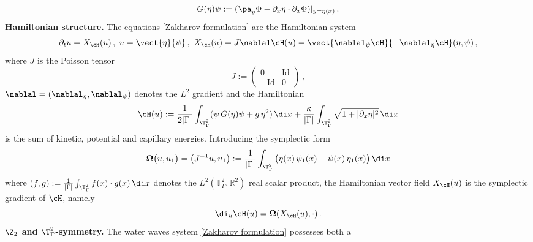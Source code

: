 \documentclass[11pt,a4paper,reqno]{article}
\numberwithin{equation}{section}
\theoremstyle{definition}
\begin{document}
    $$    G(\eta)\psi  :=
     ( \pa_y \Phi  - \partial_x \eta \cdot \partial_x\Phi)|_{y = \eta(x)} \, .
    $$ 
    {\bf Hamiltonian structure.}
    The equations \eqref{Zakharov formulation} are the Hamiltonian system 
    \begin{equation}\label{Zakharov formulation Hamiltonian}
            \partial_t  u = X_{\cH} (u) \, , \ u = \vect{\eta}{\psi}  \, , 
            \ X_{\cH} (u) = J \nablal \cH (u) = 
             \vect{\nablal_\psi \cH}{-\nablal_\eta \cH} 
             (\eta,\psi)   \, , 
    \end{equation}
    where $J$ is the Poisson tensor
    \begin{equation}\label{def J}
        J := \begin{pmatrix}
            0 & \text{Id} \\
            - \text{Id} & 0
        \end{pmatrix} \, , 
    \end{equation}
$ \nablal = (\nablal_\eta, \nablal_\psi ) $ denotes  the $L^2$ gradient and the Hamiltonian 
    \begin{equation}\label{Hamiltonian}
        \cH(u) :=\frac{1}{2|\Gamma|}\int_{\T^2_\Gamma} ( \psi \, G(\eta)\psi +  g\, \eta^2 ) \, \di x 
        + \frac{\kappa}{|\Gamma|}\int_{\T^2_\Gamma} \sqrt{1+|\partial_x \eta|^2}
        \, \di x 
    \end{equation}
    is the sum of 
    kinetic,    potential and  
capillary energies. 
Introducing the symplectic form
    \begin{equation}\label{Def W}
        \boldsymbol{\Omega}\big(u,u_1\big)=
        \big( J^{-1} u , u_1 \big) := \frac{1}{|\Gamma|}\int_{\T^2_\Gamma}\big(\eta
        (x) \,\psi_1 (x) -
        \psi (x) \,\eta_1 (x) \big)
        \, \di x 
    \end{equation}
    where 
    $
    ( f  , g ) :=
    \frac{1}{|\Gamma|}    \int_{ \T^2_\Gamma} f (x) \cdot g (x) \, \di x $  
    denotes the $L^2(\mathbb{T}^2_\Gamma, \mathbb{R}^2)$ real scalar product, 
 the Hamiltonian vector field
    $X_{\cH}(u)   $  is the symplectic gradient of $ \cH$, namely 
    \begin{equation}\label{Def Hamiltonian vector field}
    \di_u \cH(u) =
    \boldsymbol{\Omega} ( X_\cH (u), \cdot ) \, . 
    \end{equation}
    \noindent
    {\bf $ \Z_2 $  and $ \T^2_\Gamma $-symmetry.} 
The water waves system 
\eqref{Zakharov formulation}  possesses both a
\end{document}
